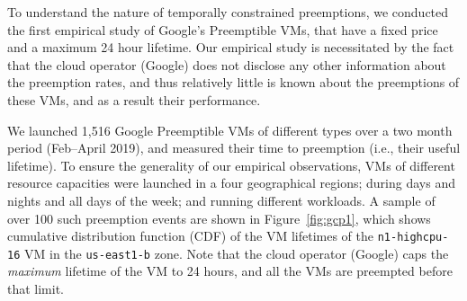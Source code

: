 To understand the nature of temporally constrained preemptions, we conducted the first empirical study of Google's Preemptible VMs, that have a fixed price and a maximum 24 hour lifetime.
Our empirical study is necessitated by the fact that the cloud operator (Google) does not disclose any other information about the preemption rates, and thus relatively little is known about the preemptions of these VMs, and as a result their performance.


We launched  1,516 Google Preemptible VMs of different types over a two month period (Feb--April 2019), and measured their time to preemption (i.e., their useful lifetime).\footnotemark
To ensure the generality of our empirical observations, VMs of different resource capacities were launched in a four geographical regions; during days and nights and all days of the week; and running different workloads. 
%
%
A sample of over 100 such preemption events are shown in Figure~\ref{fig:gcp1}, which shows cumulative distribution function (CDF) of the VM lifetimes of the \texttt{n1-highcpu-16} VM in the \texttt{us-east1-b} zone. 
Note that the cloud operator (Google) caps the \emph{maximum} lifetime of the VM to 24 hours, and all the VMs are preempted before that limit. 


